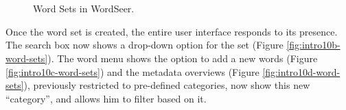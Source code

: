 \documentclass{sig-alternate}
\begin{document}
\begin{figure}[ht!]
\begin{center}
%
        \\
         \\
        \quad
%
    \end{center}
    \caption{%
       Word Sets in WordSeer. \label{fig:intro10-word-sets}
     }%
\end{figure}
Once the word set is created, the entire user interface responds to its presence. The search box now shows a drop-down option for the set  (Figure \ref{fig:intro10b-word-sets}).  The word menu shows the option to add a new words (Figure \ref{fig:intro10c-word-sets}) and the metadata overviews (Figure \ref{fig:intro10d-word-sets}), previously restricted to pre-defined categories,  now show this new ``category'', and allows him to filter based on it.   
\end{document}
